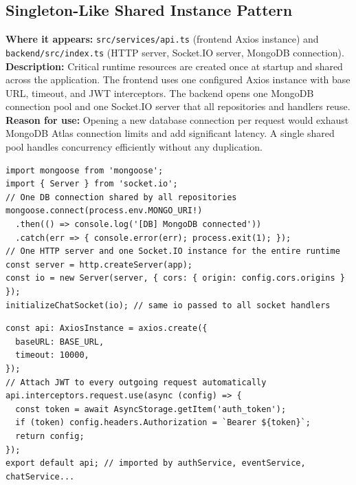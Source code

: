 \documentclass[12pt,a4paper]{article}
\begin{document}
\subsection{Singleton-Like Shared Instance Pattern}
\textbf{Where it appears:} \texttt{src/services/api.ts} (frontend Axios instance) and \texttt{backend/src/index.ts} (HTTP server, Socket.IO server, MongoDB connection).
\textbf{Description:} Critical runtime resources are created once at startup and shared
across the application. The frontend uses one configured Axios instance with base URL,
timeout, and JWT interceptors. The backend opens one MongoDB connection pool and one
Socket.IO server that all repositories and handlers reuse.
\textbf{Reason for use:} Opening a new database connection per request would exhaust
MongoDB Atlas connection limits and add significant latency. A single shared pool
handles concurrency efficiently without any duplication.
\begin{lstlisting}[caption={index.ts -- single MongoDB connection and Socket.IO instance}]
import mongoose from 'mongoose';
import { Server } from 'socket.io';
// One DB connection shared by all repositories
mongoose.connect(process.env.MONGO_URI!)
  .then(() => console.log('[DB] MongoDB connected'))
  .catch(err => { console.error(err); process.exit(1); });
// One HTTP server and one Socket.IO instance for the entire runtime
const server = http.createServer(app);
const io = new Server(server, { cors: { origin: config.cors.origins } });
initializeChatSocket(io); // same io passed to all socket handlers
\end{lstlisting}
\begin{lstlisting}[caption={api.ts -- single Axios instance shared by all client services}]
const api: AxiosInstance = axios.create({
  baseURL: BASE_URL,
  timeout: 10000,
});
// Attach JWT to every outgoing request automatically
api.interceptors.request.use(async (config) => {
  const token = await AsyncStorage.getItem('auth_token');
  if (token) config.headers.Authorization = `Bearer ${token}`;
  return config;
});
export default api; // imported by authService, eventService, chatService...
\end{lstlisting}
\end{document}

